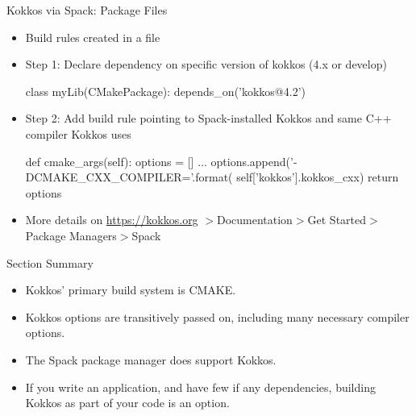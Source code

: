 \begin{frame}[fragile]{Kokkos via Spack: Package Files}
\begin{itemize}
\item Build rules created in a  file
\item Step 1: Declare dependency on specific version of kokkos (4.x or develop)
\begin{shell}
class myLib(CMakePackage):
  depends_on('kokkos@4.2')
\end{shell}
\item Step 2: Add build rule pointing to Spack-installed Kokkos and same C++ compiler Kokkos uses
\begin{shell}
def cmake_args(self):
  options = []
  ...
  options.append('-DCMAKE_CXX_COMPILER={}'.format(
      self['kokkos'].kokkos_cxx)
  return options
\end{shell}
\item More details on \url{https://kokkos.org} $>$Documentation$>$Get Started$>$Package Managers$>$Spack
\end{itemize}
\end{frame}

\begin{frame}{Section Summary}

  \begin{itemize}
    \item{Kokkos' primary build system is CMAKE.}
    \item{Kokkos options are transitively passed on, including many necessary compiler options.}
    \item{The Spack package manager does support Kokkos.}
    \item{If you write an application, and have few if any dependencies, building Kokkos as part of your code is an option.}
  \end{itemize}

\end{frame}
